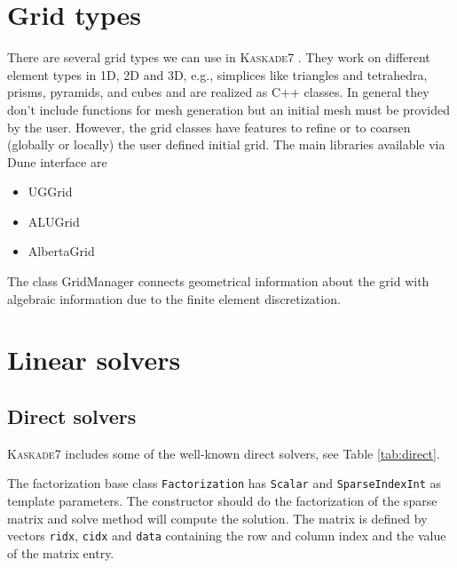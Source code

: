 \documentclass[11pt]{article}
\newcommand{\K}{\textsc{Kaskade7 }}
\begin{document}
\section{Grid types}\label{GridTypes}

There are several grid types we can use in \K. They work
on different element types in 1D, 2D and 3D, e.g.,
simplices like triangles and tetrahedra, prisms, pyramids, and cubes
and are realized as C++ classes.
In general they don't include functions for mesh generation but an initial mesh must
be provided by the user. However, the grid classes  have
features to refine or to coarsen (globally or locally) the user defined initial grid.
The main libraries available via Dune interface are

\begin{itemize}
\item UGGrid
\item ALUGrid
\item AlbertaGrid
\end{itemize}

\noindent The class GridManager connects geometrical information about the grid with algebraic
information due to the finite element discretization.



\section{Linear solvers}\label{LinSolver}
\subsection{Direct solvers}
\K includes some of the well-known direct solvers, see Table \ref{tab:direct}.

\begin{table}[ht]
\caption{Currently available direct solvers\label{tab:direct}}
\end{table}

The factorization base class {\tt Factorization} has {\tt Scalar} and {\tt SparseIndexInt} as template parameters. 
The constructor should do the factorization of the sparse matrix and solve method will compute the solution. 
The matrix is defined by vectors {\tt ridx}, {\tt cidx} and {\tt data} containing the row and column index 
and the value of the matrix entry.
\end{document}
